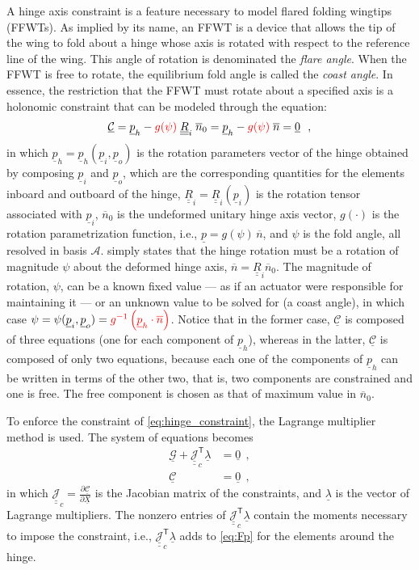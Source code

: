 \documentclass[12pt,a4paper,oneside,english]{abntex2} %
\newcommand{\fix}[1]{{\color{red}#1}}
\newcommand{\vect}[1]{\underline{#1}}
\newcommand{\uvec}[1]{\overline{#1}}
\newcommand{\del}[2]{\frac{\partial#1}{\partial#2}}
\def\tens#1{\underline{\underline{#1}}}
\def\lp{\left(}
\def\rp{\right)}
\def\T{\mathsf{T}}
\def\A{\mathcal{A}}
\def\R{\tens{R}}
\def\p{\vect{p}}
\def\zv{\vect{0}}
\def\Sys{\mathcal{\vect{G}}}
\def\X{\vect{X}}
\def\JacSys{\tens{\mathcal{J}}}
\def\lambv{\vect{\lambda}}
\begin{document}
A hinge axis constraint is a feature necessary to model flared folding wingtips (FFWTs). As implied by its name, an FFWT is a device that allows the tip of the wing to fold about a hinge whose axis is rotated with respect to the reference line of the wing. This angle of rotation is denominated the \textit{flare angle}. When the FFWT is free to rotate, the equilibrium fold angle is called the \textit{coast angle}. In essence, the restriction that the FFWT must rotate about a specified axis is a holonomic constraint that can be modeled through the equation:
\begin{align}
    \mathcal{\vect{C}} = \p_h - \fix{g(\psi)}\;\R_i\;\uvec{n}_0 = \p_h - \fix{g(\psi)}\;\uvec{n} = \zv \ \ ,
    \label{eq:hinge_constraint}
\end{align}
in which $\p_h = \p_h(\p_i,\p_o)$ is the rotation parameters vector of the hinge obtained by composing $\p_i$ and $\p_o$, which are the corresponding quantities for the elements inboard and outboard of the hinge, $\R_i=\R_i(\p_i)$ is the rotation tensor associated with $\p_i$, $\uvec{n}_0$ is the undeformed unitary hinge axis vector, \fix{$g(\cdot)$ is the rotation parametrization function, i.e., $\p = g(\psi)\,\uvec{n}$}, and $\psi$ is the fold angle, all resolved in basis $\A$.  simply states that the hinge rotation must be a rotation of magnitude $\psi$ about the deformed hinge axis, $\uvec{n}=\R_i\uvec{n}_0$. The magnitude of rotation, $\psi$, can be a known fixed value --- as if an actuator were responsible for maintaining it --- or an unknown value to be solved for (a coast angle), in which case $\psi=\psi(\p_i,\p_o)=\fix{g^{-1}\lp\p_h\cdot \uvec{n}\rp}$. Notice that in the former case, $\mathcal{\vect{C}}$ is composed of three equations (one for each component of $\p_h$), whereas in the latter, $\mathcal{\vect{C}}$ is composed of only two equations, because each one of the components of $\p_h$ can be written in terms of the other two, that is, two components are constrained and one is free. The free component is chosen as that of maximum value in $\uvec{n}_0$.

To enforce the constraint of \cref{eq:hinge_constraint}, the Lagrange multiplier method \cite{bauchau2011flexible} is used. The system of equations becomes
\begin{align}
    \Sys + \JacSys_c^\T\lambv &= \zv \ \ ,
    \label{eq:expanded_system_hinge_const1}
    \\
    \mathcal{\vect{C}} &= \zv \ \ ,
    \label{eq:expanded_system_hinge_const2}
\end{align}
in which $\JacSys_c = \del{\mathcal{\vect{C}}}{\X}$ is the Jacobian matrix of the constraints, and $\lambv$ is the vector of Lagrange multipliers. The nonzero entries of $\JacSys_c^\T\lambv$ contain the moments necessary to impose the constraint, i.e., $\JacSys_c^\T\lambv$ adds to \cref{eq:Fp} for the elements around the hinge.
\end{document}
